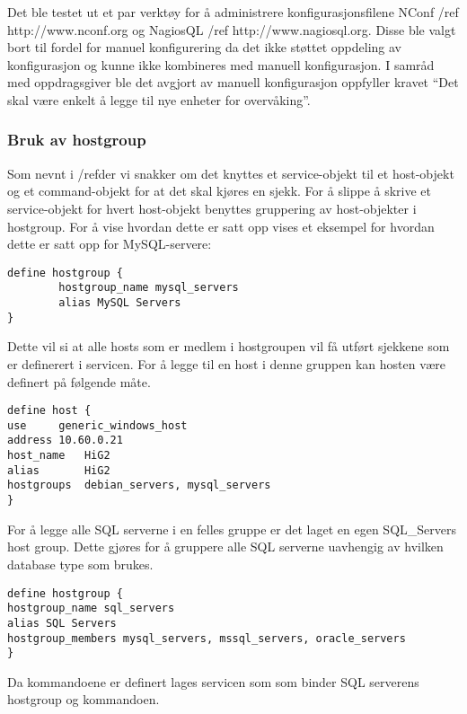 Det ble testet ut et par verktøy for å administrere konfigurasjonsfilene NConf /ref http://www.nconf.org og NagiosQL /ref http://www.nagiosql.org. Disse ble valgt bort til fordel for manuel konfigurering da det ikke støttet oppdeling av konfigurasjon og kunne ikke kombineres med manuell konfigurasjon. I samråd med oppdragsgiver ble det avgjort av manuell konfigurasjon oppfyller kravet “Det skal være enkelt å legge til nye enheter for overvåking”.

\subsubsection{Bruk av hostgroup}
Som nevnt i /ref{der vi snakker om det} knyttes et service-objekt til et host-objekt og et command-objekt for at det skal kjøres en sjekk. For å slippe å skrive et service-objekt for hvert host-objekt benyttes gruppering av host-objekter i hostgroup. For å vise hvordan dette er satt opp vises et eksempel for hvordan dette er satt opp for MySQL-servere:

\begin{lstlisting}
define hostgroup {
        hostgroup_name mysql_servers
        alias MySQL Servers
}
\end{lstlisting}
Dette vil si at alle hosts som er medlem i hostgroupen vil få utført sjekkene som er definerert i servicen. For å legge til en host i denne gruppen kan hosten være definert på følgende måte.

\begin{lstlisting}
define host {
use		generic_windows_host
address	10.60.0.21
host_name	HiG2
alias		HiG2
hostgroups	debian_servers, mysql_servers
}
\end{lstlisting}
For å legge alle SQL serverne i en felles gruppe er det laget en egen SQL\_Servers host group. Dette gjøres for å gruppere alle SQL serverne uavhengig av hvilken database type som brukes. 

\begin{lstlisting}
define hostgroup {
hostgroup_name sql_servers
alias SQL Servers
hostgroup_members mysql_servers, mssql_servers, oracle_servers
}
\end{lstlisting}
Da kommandoene er definert lages servicen som som binder SQL serverens hostgroup og kommandoen.

